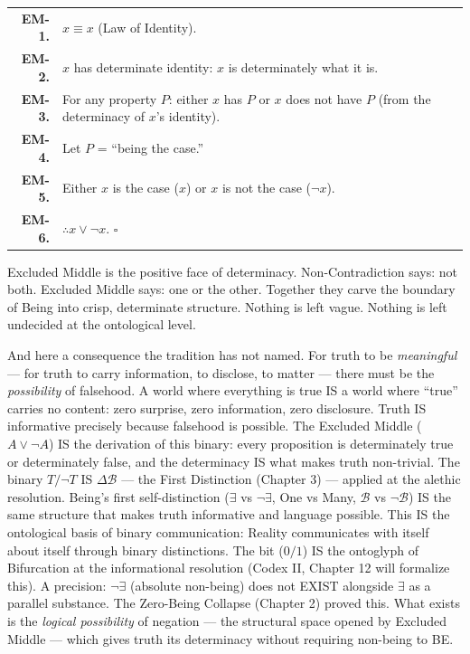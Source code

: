 \documentclass[10pt, openany, oneside]{book}
\renewcommand{\footnotesize}{\fontsize{8.5}{11}\selectfont}
\begin{document}
{\footnotesize
\noindent\begin{tabular}{r p{}}
\textbf{EM-1.} & $x \equiv x$ (Law of Identity). \\[0.3em]
\textbf{EM-2.} & $x$ has determinate identity: $x$ is determinately what it is. \\[0.3em]
\textbf{EM-3.} & For any property $P$: either $x$ has $P$ or $x$ does not have $P$ (from the determinacy of $x$'s identity). \\[0.3em]
\textbf{EM-4.} & Let $P$ = ``being the case.'' \\[0.3em]
\textbf{EM-5.} & Either $x$ is the case ($x$) or $x$ is not the case ($\neg x$). \\[0.3em]
\textbf{EM-6.} & $\therefore x \vee \neg x$. $\square$ \\[0.3em]
\end{tabular}
}

\vspace{0.8em}

\noindent Excluded Middle is the positive face of determinacy. Non-Contradiction says: not both. Excluded Middle says: one or the other. Together they carve the boundary of Being into crisp, determinate structure. Nothing is left vague. Nothing is left undecided at the ontological level.

And here a consequence the tradition has not named. For truth to be \textit{meaningful} --- for truth to carry information, to disclose, to matter --- there must be the \textit{possibility} of falsehood. A world where everything is true IS a world where ``true'' carries no content: zero surprise, zero information, zero disclosure. Truth IS informative precisely because falsehood is possible. The Excluded Middle ($A \vee \neg A$) IS the derivation of this binary: every proposition is determinately true or determinately false, and the determinacy IS what makes truth non-trivial. The binary $T/\neg T$ IS $\Delta\mathcal{B}$ --- the First Distinction (Chapter 3) --- applied at the alethic resolution. Being's first self-distinction ($\exists$ vs $\neg\exists$, One vs Many, $\mathcal{B}$ vs $\neg\mathcal{B}$) IS the same structure that makes truth informative and language possible. This IS the ontological basis of binary communication: Reality communicates with itself about itself through binary distinctions. The bit ($0/1$) IS the ontoglyph of Bifurcation at the informational resolution (Codex II, Chapter 12 will formalize this). A precision: $\neg\exists$ (absolute non-being) does not EXIST alongside $\exists$ as a parallel substance. The Zero-Being Collapse (Chapter 2) proved this. What exists is the \textit{logical possibility} of negation --- the structural space opened by Excluded Middle --- which gives truth its determinacy without requiring non-being to BE.
\end{document}
